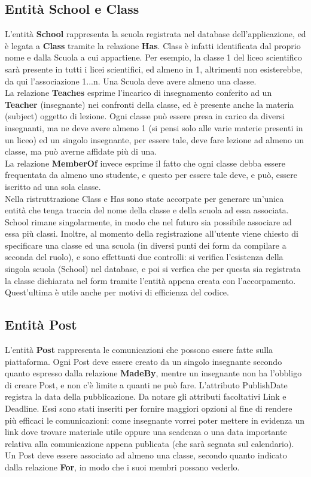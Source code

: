 \documentclass[Lau, binding=0.6cm]{sapthesis}
\begin{document}
\subsection{Entità School e Class}
L'entità \textbf{School} rappresenta la scuola registrata nel database dell'applicazione, ed è legata a \textbf{Class} tramite la relazione \textbf{Has}. Class è infatti identificata dal proprio nome e dalla Scuola a cui appartiene. Per esempio, la classe 1 del liceo scientifico sarà presente in tutti i licei scientifici, ed almeno in 1, altrimenti non esisterebbe, da qui l'associazione 1...n. Una Scuola deve avere almeno una classe.\\
La relazione \textbf{Teaches} esprime l'incarico di insegnamento conferito ad un \textbf{Teacher} (insegnante) nei confronti della classe, ed è presente anche la materia (subject) oggetto di lezione. Ogni classe può essere presa in carico da diversi insegnanti, ma ne deve avere almeno 1 (si pensi solo alle varie materie presenti in  un liceo) ed un singolo insegnante, per essere tale, deve fare lezione ad almeno un classe, ma può averne affidate più di una.\\
La relazione \textbf{MemberOf} invece esprime il fatto che ogni classe debba essere frequentata da almeno uno studente, e questo per essere tale deve, e può, essere iscritto ad una sola classe.\\
Nella ristruttrazione Class e Has sono state accorpate per generare un'unica entità che tenga traccia del nome della classe e della scuola ad essa associata. School rimane singolarmente, in modo che nel futuro sia possibile associare ad essa più classi. Inoltre, al momento della registrazione
all'utente viene chiesto di specificare una classe ed una scuola (in diversi punti dei form da compilare a seconda del ruolo), e sono effettuati due controlli: si verifica l'esistenza della singola scuola (School) nel database, e poi si verfica che per questa sia registrata la classe dichiarata nel form tramite l'entità appena creata con l'accorpamento. Quest'ultima è utile anche per motivi di efficienza del codice.

\subsection{Entità Post}
L'entità \textbf{Post} rappresenta le comunicazioni che possono essere fatte sulla piattaforma. Ogni Post deve essere creato da un singolo insegnante secondo quanto espresso dalla relazione \textbf{MadeBy}, mentre un insegnante non ha l'obbligo di creare Post, e non c'è limite a quanti ne può fare. L'attributo PublishDate registra la data della pubblicazione.
Da notare gli attributi facoltativi Link e Deadline. Essi sono stati inseriti per fornire maggiori opzioni al fine di rendere più efficaci le comunicazioni: come insegnante vorrei poter mettere in evidenza un link dove trovare materiale utile oppure una scadenza o una data importante relativa alla comunicazione appena publicata (che sarà segnata sul calendario).\\
Un Post deve essere associato ad almeno una classe, secondo quanto indicato dalla relazione \textbf{For}, in modo che i suoi membri possano vederlo.
\end{document}
